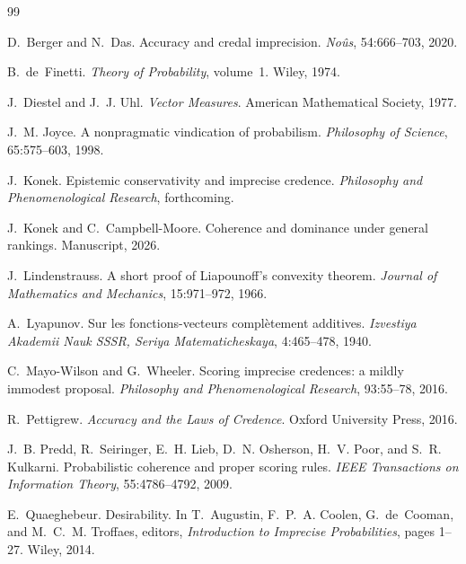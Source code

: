 \documentclass[11pt]{article}
\theoremstyle{plain}
\theoremstyle{definition}
\theoremstyle{remark}
\begin{document}
\begin{thebibliography}{99}

D.~Berger and N.~Das.
\newblock Accuracy and credal imprecision.
\newblock \emph{No\^us}, 54:666--703, 2020.

B.~de~Finetti.
\newblock \emph{Theory of Probability}, volume~1.
\newblock Wiley, 1974.

J.~Diestel and J.~J. Uhl.
\newblock \emph{Vector Measures}.
\newblock American Mathematical Society, 1977.

J.~M. Joyce.
\newblock A nonpragmatic vindication of probabilism.
\newblock \emph{Philosophy of Science}, 65:575--603, 1998.

J.~Konek.
\newblock Epistemic conservativity and imprecise credence.
\newblock \emph{Philosophy and Phenomenological Research}, forthcoming.

J.~Konek and C.~Campbell-Moore.
\newblock Coherence and dominance under general rankings.
\newblock Manuscript, 2026.

J.~Lindenstrauss.
\newblock A short proof of {L}iapounoff's convexity theorem.
\newblock \emph{Journal of Mathematics and Mechanics}, 15:971--972, 1966.

A.~Lyapunov.
\newblock Sur les fonctions-vecteurs compl\`etement additives.
\newblock \emph{Izvestiya Akademii Nauk SSSR, Seriya Matematicheskaya}, 4:465--478, 1940.

C.~Mayo-Wilson and G.~Wheeler.
\newblock Scoring imprecise credences: a mildly immodest proposal.
\newblock \emph{Philosophy and Phenomenological Research}, 93:55--78, 2016.

R.~Pettigrew.
\newblock \emph{Accuracy and the Laws of Credence}.
\newblock Oxford University Press, 2016.

J.~B. Predd, R.~Seiringer, E.~H. Lieb, D.~N. Osherson, H.~V. Poor, and S.~R. Kulkarni.
\newblock Probabilistic coherence and proper scoring rules.
\newblock \emph{IEEE Transactions on Information Theory}, 55:4786--4792, 2009.

E.~Quaeghebeur.
\newblock Desirability.
\newblock In T.~Augustin, F.~P.~A. Coolen, G.~de~Cooman, and M.~C.~M. Troffaes, editors,
\emph{Introduction to Imprecise Probabilities}, pages 1--27. Wiley, 2014.


\end{thebibliography}
\end{document}
